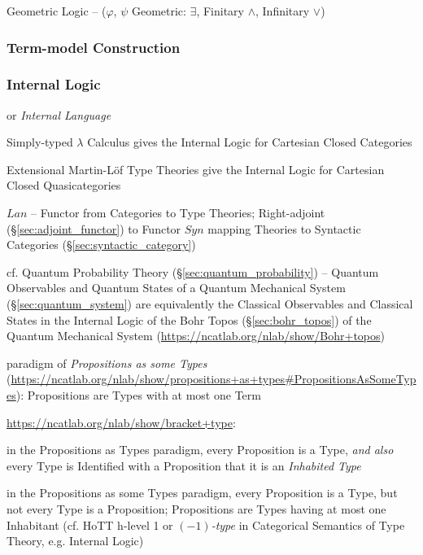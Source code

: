 Geometric Logic -- ($\varphi$, $\psi$ Geometric: $\exists$, Finitary
$\wedge$, Infinitary $\vee$)




\subsubsection{Term-model Construction}\label{sec:term_model}

\subsubsection{Internal Logic}\label{sec:internal_logic}

or \emph{Internal Language}

Simply-typed $\lambda$ Calculus gives the Internal Logic for Cartesian Closed
Categories

Extensional Martin-L\"of Type Theories give the Internal Logic for Cartesian
Closed Quasicategories

$Lan$ -- Functor from Categories to Type Theories; Right-adjoint
(\S\ref{sec:adjoint_functor}) to Functor $Syn$ mapping Theories to Syntactic
Categories (\S\ref{sec:syntactic_category})

\fist cf. Quantum Probability Theory (\S\ref{sec:quantum_probability}) --
Quantum Observables and Quantum States of a Quantum Mechanical System
(\S\ref{sec:quantum_system}) are equivalently the Classical Observables and
Classical States in the Internal Logic of the Bohr Topos
(\S\ref{sec:bohr_topos}) of the Quantum Mechanical System
(\url{https://ncatlab.org/nlab/show/Bohr+topos})

paradigm of \emph{Propositions as some Types}
(\url{https://ncatlab.org/nlab/show/propositions+as+types#PropositionsAsSomeTypes}):
Propositions are Types with at most one Term

\url{https://ncatlab.org/nlab/show/bracket+type}:

in the Propositions as Types paradigm, every Proposition is a Type, \emph{and
  also} every Type is Identified with a Proposition that it is an
\emph{Inhabited Type}

in the Propositions as some Types paradigm, every Proposition is a Type, but
not every Type is a Proposition; Propositions are Types having at most one
Inhabitant (cf. HoTT h-level 1 or \emph{$(-1)$-type} in Categorical Semantics of
Type Theory, e.g. Internal Logic)



